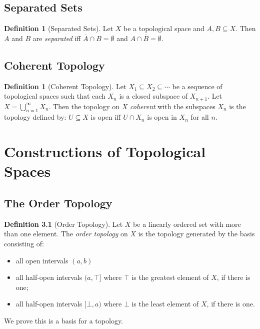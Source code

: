 \documentclass{report}
\theoremstyle{definition}
\newtheorem{df}[lm]{Definition}
\begin{document}
  \section{Separated Sets}

    \begin{df}[Separated Sets]
   Let $X$ be a topological space and $A, B \subseteq X$. Then $A$ and $B$ are
   \emph{separated} iff $\overline{A} \cap B = \emptyset$ and $A \cap
   \overline{B} = \emptyset$.
  \end{df}

  \section{Coherent Topology}

   \begin{df}[Coherent Topology]
  Let $X_1 \subseteq X_2 \subseteq \cdots$ be a sequence of topological spaces
  such that each $X_n$ is a closed subspace of $X_{n+1}$. Let $X =
  \bigcup_{n=1}^\infty X_n$. Then the topology on $X$ \emph{coherent} with the
  subspaces $X_n$ is the topology defined by: $U \subseteq X$ is open iff $U
  \cap  X_n$ is open in $X_n$ for all $n$.
 \end{df}

  \chapter{Constructions of Topological Spaces}

  \section{The Order Topology}

  \begin{df}[Order Topology]
    Let $X$ be a linearly ordered set with more than one element. The
    \emph{order
      topology} on $X$ is the topology generated by the basis consisting of:
    \begin{itemize}
      \item all open intervals $(a, b)$
      \item all half-open intervals $(a, \top]$ where $\top$ is the greatest
      element of $X$, if there is one;
      \item all half-open intervals $[\bot, a)$ where $\bot$ is the least
      element of
      $X$, if there is one.
    \end{itemize}

    We prove this is a basis for a topology.
  \end{df}
\end{document}
